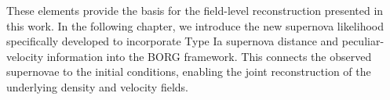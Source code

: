 These elements provide the basis for the field-level reconstruction presented in this work. In the following chapter, we introduce the new supernova likelihood 
specifically developed to incorporate Type Ia supernova distance and peculiar-velocity information into the BORG framework. 
This connects the observed supernovae to the initial conditions, enabling the joint reconstruction of the underlying density and velocity fields.